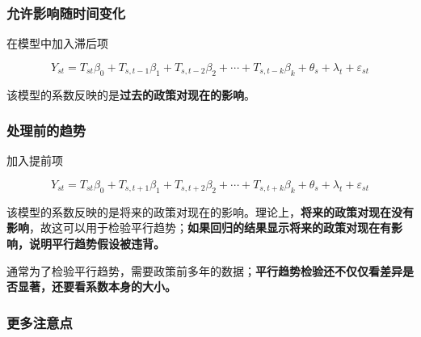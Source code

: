 \documentclass[11pt,a4paper]{ctexart}
\newcommand{\ve}{\varepsilon}
\begin{document}
\subsubsection{允许影响随时间变化}

在模型中加入滞后项

\[Y_{st}=T_{st}\beta_0+T_{s,t-1}\beta_1+T_{s,t-2}\beta_2+\cdots+T_{s,t-k}\beta_k+\theta_s+\lambda_t+\ve_{st}\]

该模型的系数反映的是\textbf{过去的政策对现在的影响}。

\subsubsection{处理前的趋势}

加入提前项

\[Y_{st}=T_{st}\beta_0+T_{s,t+1}\beta_1+T_{s,t+2}\beta_2+\cdots+T_{s,t+k}\beta_k+\theta_s+\lambda_t+\ve_{st}\]

该模型的系数反映的是将来的政策对现在的影响。理论上，\textbf{将来的政策对现在没有影响}，故这可以用于检验平行趋势；\textbf{如果回归的结果显示将来的政策对现在有影响，说明平行趋势假设被违背。}

通常为了检验平行趋势，需要政策前多年的数据；\textbf{平行趋势检验还不仅仅看差异是否显著，还要看系数本身的大小。}

\subsubsection{更多注意点}
\end{document}
